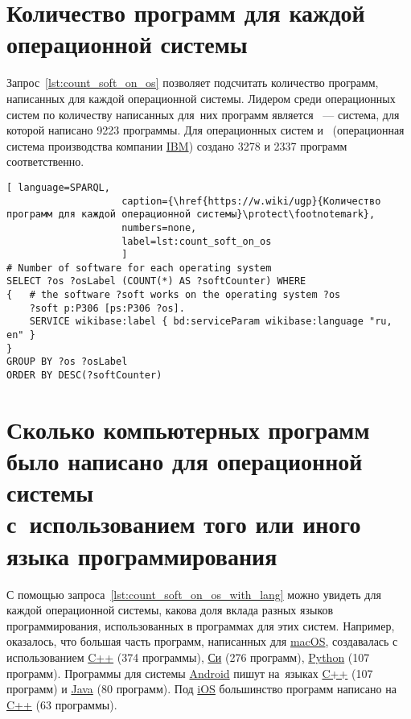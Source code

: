 \section{Количество программ для каждой операционной системы}

Запрос~\ref{lst:count_soft_on_os} позволяет подсчитать количество программ, 
написанных для каждой операционной системы.
Лидером среди операционных систем по количеству написанных для~них программ 
    является ~--- система, для которой написано \num{9223} программы. 
    Для операционных систем  и~ 
    (операционная система производства компании \href{https://www.wikidata.org/wiki/Q37156}{IBM}) 
    создано \num{3278} и \num{2337} программ соответственно.


\newpage
\begin{lstlisting}[ language=SPARQL, 
                    caption={\href{https://w.wiki/ugp}{Количество программ для каждой операционной системы}\protect\footnotemark},
                    numbers=none,
                    label=lst:count_soft_on_os
                    ]
# Number of software for each operating system
SELECT ?os ?osLabel (COUNT(*) AS ?softCounter) WHERE
{   # the software ?soft works on the operating system ?os
    ?soft p:P306 [ps:P306 ?os].
    SERVICE wikibase:label { bd:serviceParam wikibase:language "ru, en" }
}
GROUP BY ?os ?osLabel
ORDER BY DESC(?softCounter)
\end{lstlisting}





\section{Сколько компьютерных программ было написано для операционной системы\\с~использованием того или иного языка программирования}

С помощью запроса~\ref{lst:count_soft_on_os_with_lang} можно увидеть для каждой операционной системы, 
какова доля вклада разных языков программирования, использованных в программах для этих систем. 
Например, оказалось, что большая часть программ, 
написанных для \href{https://www.wikidata.org/wiki/Q14116}{macOS}, 
создавалась с использованием \href{https://www.wikidata.org/wiki/Q2407}{C++} (374 программы), 
\href{https://www.wikidata.org/wiki/Q15777}{Си} (276 программ), 
\href{https://www.wikidata.org/wiki/Q28865}{Python} (107 программ).
Программы для системы \href{https://www.wikidata.org/wiki/Q94}{Android} пишут 
на~языках \href{https://www.wikidata.org/wiki/Q2407}{C++} (107 программ) 
и \href{https://www.wikidata.org/wiki/Q251}{Java} (80 программ).
Под \href{https://www.wikidata.org/wiki/Q48493}{iOS} большинство программ 
написано на \href{https://www.wikidata.org/wiki/Q2407}{C++} (63 программы).

